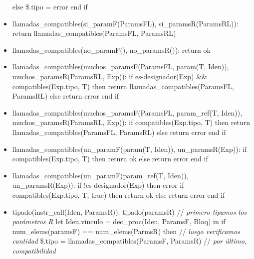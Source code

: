 \documentclass[11pt]{article}
\begin{document}
\begin{itemize}
                \subitem else
                    \subsubitem \$.tipo = error
                \subitem end if
            \item llamadas\_compatibles(si\_paramF(ParamsFL), si\_paramsR(ParamsRL)): 
                \subitem return llamadas\_compatibles(ParamsFL, ParamsRL)
            \item llamadas\_compatibles(no\_paramF(), no\_paramsR()): 
                \subitem return ok
            \item llamadas\_compatibles(muchos\_paramsF(ParamsFL, param(T, Iden)), muchos\_paramsR(ParamsRL, Exp)): 
                \subitem if es-designador(Exp) \&\&  compatibles(Exp.tipo, T) then
                    \subsubitem return llamadas\_compatibles(ParamsFL, ParamsRL)
                \subitem else 
                    \subsubitem return error
                \subitem end if
            \item llamadas\_compatibles(muchos\_paramsF(ParamsFL, param\_ref(T, Iden)), muchos\_paramsR(ParamsRL, Exp)): 
                \subitem if compatibles(Exp.tipo, T) then
                    \subsubitem return llamadas\_compatibles(ParamsFL, ParamsRL)
                \subitem else 
                    \subsubitem return error
                \subitem end if
            \item llamadas\_compatibles(un\_paramF(param(T, Iden)), un\_paramsR(Exp)): 
                \subitem if compatibles(Exp.tipo, T) then
                    \subsubitem return ok
                \subitem else 
                    \subsubitem return error
                \subitem end if
            \item llamadas\_compatibles(un\_paramF(param\_ref(T, Iden)), un\_paramsR(Exp)): 
                \subitem if !es-designador(Exp) then
                    \subsubitem error
                \subitem if compatibles(Exp.tipo, T, true) then
                    \subsubitem return ok
                \subitem else 
                    \subsubitem return error
                \subitem end if
            \item tipado(instr\_call(Iden, ParamsR)): 
                \subitem tipado(paramsR) \/// \textit{primero tipamos los parámetros R}
                \subitem let Iden.vinculo = dec\_proc(Iden, ParamsF, Bloq) in
                    \subsubitem if num\_elems(paramsF) == num\_elems(ParmsR) then \/// \textit{luego verificamos cantidad}
                        \subsubitem \hspace{2em} \$.tipo = llamadas\_compatibles(ParamsF, ParamsR) \/// \textit{por último, compatibilidad}

\end{itemize}
\end{document}
